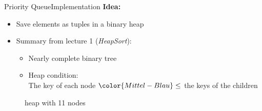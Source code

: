 \begin{frame}{Priority Queue}{Implementation}
  \textbf{Idea:}
  \begin{itemize}
    \item<2->
      Save elements as tuples in a binary heap
    \item<3->
      Summary from lecture 1 (\textit{HeapSort}):
    \begin{itemize}
      \item<3->
        Nearly complete binary tree
      \item<3->
        {\color{Mittel-Blau}Heap condition}:\\
        The key of each node ${\color{Mittel-Blau}\leq}$ the keys of the
        children\\
    \end{itemize}
  \end{itemize}
  \vspace{-0.5em}
  \begin{figure}[!h]
    \begin{adjustbox}{height=0.3\linewidth}
    \end{adjustbox}
    \vspace{-0.75em}
    \caption{heap with 11 nodes}%
    \label{fig:priority_queue:impl_heap}%
  \end{figure}
\end{frame}


